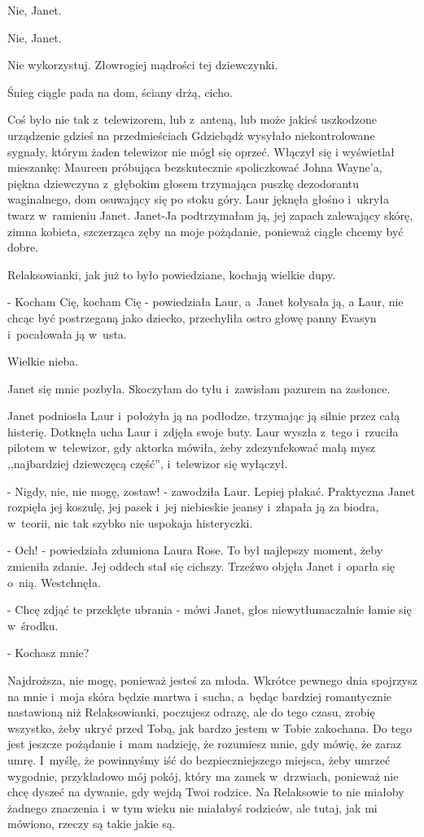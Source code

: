 \documentclass[oneside,polish,12pt,sfheadings]{mwbk}
\begin{document}
Nie, Janet.

Nie, Janet.

Nie wykorzystuj. Złowrogiej mądrości tej dziewczynki.

Śnieg ciągle pada na dom, ściany drżą, cicho.

Coś było nie tak z~telewizorem, lub z~anteną, lub może jakieś uszkodzone
urządzenie gdzieś na przedmieściach Gdziebądż wysyłało niekontrolowane
sygnały, którym żaden telewizor nie mógł się oprzeć. Włączył się i
wyświetlał mieszankę: Maureen próbująca bezskutecznie spoliczkować
Johna Wayne'a, piękna dziewczyna z~głębokim głosem trzymająca puszkę
dezodorantu waginalnego, dom osuwający się po stoku góry. Laur jęknęła
głośno i~ukryła twarz w~ramieniu Janet. Janet-Ja podtrzymałam ją,
jej zapach zalewający skórę, zimna kobieta, szczerząca zęby na moje
pożądanie, ponieważ ciągle chcemy być dobre.

Relaksowianki, jak już to było powiedziane, kochają wielkie dupy.

- Kocham Cię, kocham Cię - powiedziała Laur, a~Janet kołysała ją,
a Laur, nie chcąc być postrzeganą jako dziecko, przechyliła ostro
głowę panny Evasyn i~pocałowała ją w~usta.

Wielkie nieba.

Janet się mnie pozbyła. Skoczyłam do tyłu i~zawisłam pazurem na zasłonce.

Janet podniosła Laur i~położyła ją na podłodze, trzymając ją silnie
przez całą histerię. Dotknęła ucha Laur i~zdjęła swoje buty. Laur
wyszła z~tego i~rzuciła pilotem w~telewizor, gdy aktorka mówiła, żeby
zdezynfekować małą mysz ,,najbardziej dziewczęcą część'', i~telewizor
się wyłączył.

- Nigdy, nie, nie mogę, zostaw! - zawodziła Laur. Lepiej płakać. Praktyczna
Janet rozpięła jej koszulę, jej pasek i~jej niebieskie jeansy i~złapała
ją za biodra, w~teorii, nic tak szybko nie uspokaja histeryczki.

- Och! - powiedziała zdumiona Laura Rose. To był najlepszy moment,
żeby zmieniła zdanie. Jej oddech stał się cichszy. Trzeźwo objęła
Janet i~oparła się o~nią. Westchnęła.

- Chcę zdjąć te przeklęte ubrania - mówi Janet, głos niewytłumaczalnie
łamie się w~środku.

- Kochasz mnie?

Najdroższa, nie mogę, ponieważ jesteś za młoda. Wkrótce pewnego dnia
spojrzysz na mnie i~moja skóra będzie martwa i~sucha, a~będąc bardziej
romantycznie nastawioną niż Relaksowianki, poczujesz odrazę, ale do
tego czasu, zrobię wszystko, żeby ukryć przed Tobą, jak bardzo jestem
w Tobie zakochana. Do tego jest jeszcze pożądanie i~mam nadzieję,
że rozumiesz mnie, gdy mówię, że zaraz umrę. I~myślę, że powinnyśmy
iść do bezpieczniejszego miejsca, żeby umrzeć wygodnie, przykładowo
mój pokój, który ma zamek w~drzwiach, ponieważ nie chcę dyszeć na
dywanie, gdy wejdą Twoi rodzice. Na Relaksowie to nie miałoby żadnego
znaczenia i~w tym wieku nie miałabyś rodziców, ale tutaj, jak mi mówiono,
rzeczy są takie jakie są.
\end{document}

